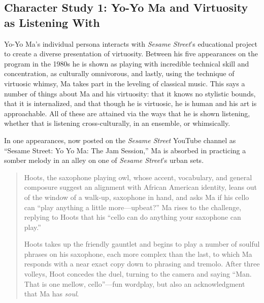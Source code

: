\documentclass[12pt,letterpaper]{article}
\newcommand{\ses}{\textit{Sesame Street }}
\providecommand{\DIFaddbegin}{} %
\providecommand{\DIFaddend}{} %
\newcommand{\DIFaddincludegraphics}[2][]{{\color{blue}\fbox{\DIFOincludegraphics[#1]{#2}}}} %
\DeclareRobustCommand{\DIFaddbegin}{\DIFOaddbegin \let\includegraphics\DIFaddincludegraphics} %
\DeclareRobustCommand{\DIFaddend}{\DIFOaddend \let\includegraphics\DIFOincludegraphics} %
\begin{document}
	\subsection*{Character Study 1: Yo-Yo Ma and Virtuosity as 
	Listening With} 

	Yo-Yo Ma's individual persona interacts with \textit{Sesame Street}'s
	educational project to create a diverse presentation of virtuosity. 
	Between his five appearances on the program in the 1980s he is shown as 
	playing with incredible technical skill and concentration, as 
	culturally omnivorous, and lastly, using the technique of virtuosic 
	whimsy, Ma 
	takes part in the leveling of classical music. This says a number of 
	things about Ma and his virtuosity: that it knows no stylistic bounds,
	that it is internalized, and that though he is virtuosic, he is 
	human
	and his art is approachable. All of these are attained via the ways
	that he is shown listening, whether that is listening 
	cross-culturally, in an ensemble, or whimsically.  

	In one appearances, now posted on the 
	\ses YouTube channel as ``Sesame Street: Yo Yo Ma: The Jam Session,'' 
	Ma is absorbed in practicing a somber melody in an alley on one of 
	\textit{Sesame Street}'s urban sets.

	\begin{quote}	
\DIFaddbegin 

	\ttfamily

	\DIFaddend Hoots, the saxophone playing owl, whose accent, vocabulary, and general
	composure suggest an alignment with African American identity, leans out
	of the window of a walk-up, saxophone in hand, and asks Ma if his cello
	can ``play anything a little more---upbeat?'' Ma rises to the challenge,
	replying to Hoots that his ``cello can do anything your saxophone can 
	play.''

	Hoots takes up the friendly gauntlet and begins to play a number of 
	soulful phrases on his saxophone, each more complex than the last, to 
	which Ma responds with a near exact copy down to phrasing and tremolo. 
	After three volleys, Hoot concedes the duel, turning to the camera and 
	saying ``Man. That is one mellow, cello''---fun wordplay, but also an 
	acknowledgment that Ma has \textit{soul}.

	\end{quote}
\end{document}
